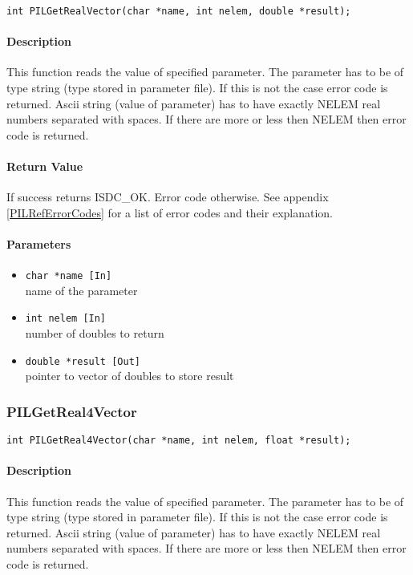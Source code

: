 \begin{verbatim}
int PILGetRealVector(char *name, int nelem, double *result); 
\end{verbatim}

\paragraph{Description\\}
This function reads the value of specified parameter. The parameter has
to be of type string (type stored in parameter file). If this is not the
case error code is returned. Ascii string (value of parameter) has to have
exactly NELEM real numbers separated with spaces. If there are more
or less then NELEM then error code is returned.

\paragraph{Return Value\\}
If success returns ISDC\_OK. Error code otherwise. See appendix \ref{PILRefErrorCodes}
for a list of error codes and their explanation.

\paragraph{Parameters}
\begin{itemize}
\item
{\tt char *name [In]} \\
name of the parameter
\item
{\tt int nelem [In]} \\
number of doubles to return
\item
{\tt double *result [Out]} \\
pointer to vector of doubles to store result
\end{itemize}



\subsubsection{PILGetReal4Vector}

\begin{verbatim}
int PILGetReal4Vector(char *name, int nelem, float *result);
\end{verbatim}

\paragraph{Description\\}
This function reads the value of specified parameter. The parameter has
to be of type string (type stored in parameter file). If this is not the
case error code is returned. Ascii string (value of parameter) has to have
exactly NELEM real numbers separated with spaces. If there are more
or less then NELEM then error code is returned.

